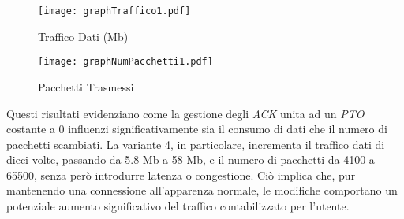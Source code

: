 \begin{figure}[!h]
    \centering
    \begin{minipage}{0.48\textwidth}
        \centering
        \texttt{[image: graphTraffico1.pdf]}
        \caption{Traffico Dati (Mb)}
        \label{grafico12}
    \end{minipage}
    \hfill
    \begin{minipage}{0.48\textwidth}
        \centering
        \texttt{[image: graphNumPacchetti1.pdf]}
        \caption{Pacchetti Trasmessi}
        \label{grafico1}
    \end{minipage}
\end{figure}
\noindent Questi risultati evidenziano come la gestione degli \emph{ACK} unita ad un \emph{PTO} costante a 0 influenzi significativamente sia il consumo di dati che il numero di pacchetti scambiati.
La variante 4, in particolare, incrementa il traffico dati di dieci volte, passando da 5.8 Mb a 58 Mb, e il numero di pacchetti da 4100 a 65500, senza però introdurre latenza o congestione. 
Ciò implica che, pur mantenendo una connessione all'apparenza normale, le modifiche comportano un potenziale aumento significativo del traffico contabilizzato per l'utente.
